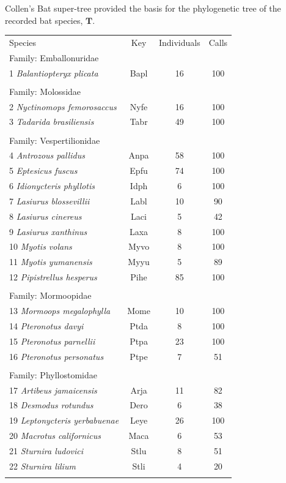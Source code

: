 \documentclass[wsdraft]{ws-rv9x6} %
\begin{document}
Collen's \cite{collen2012evolution} Bat super-tree provided the basis for the phylogenetic tree of the recorded bat species, \(\mathbf{T}\). 

\begin{table}[ht]
	{\begin{tabular}{@{}lccc@{}} \toprule
			Species & Key & Individuals & Calls \\ \colrule
			Family: Emballonuridae &&& \\
			1 \textit{Balantiopteryx plicata} & Bapl & 16 & 100 \\
			\\
			Family: Molossidae &&& \\
			2 \textit{Nyctinomops femorosaccus} & Nyfe & 16 & 100 \\
			3 \textit{Tadarida brasiliensis} & Tabr & 49 & 100  \\
			\\
			Family: Vespertilionidae &&& \\
			4 \textit{Antrozous pallidus} & Anpa & 58 & 100 \\
			5 \textit{Eptesicus fuscus} & Epfu & 74 & 100 \\
			6 \textit{Idionycteris phyllotis} & Idph & 6 & 100 \\
			7 \textit{Lasiurus blossevillii} & Labl & 10 & 90 \\
			8 \textit{Lasiurus cinereus} & Laci & 5 & 42 \\
			9 \textit{Lasiurus xanthinus} & Laxa & 8 & 100 \\
			10 \textit{Myotis volans} & Myvo & 8 & 100 \\
			11 \textit{Myotis yumanensis} & Myyu & 5 & 89 \\
			12 \textit{Pipistrellus hesperus} & Pihe & 85 & 100 \\
			\\
			Family: Mormoopidae &&& \\
			13 \textit{Mormoops megalophylla} & Mome & 10 & 100 \\
			14 \textit{Pteronotus davyi} & Ptda & 8 & 100 \\
			15 \textit{Pteronotus parnellii} & Ptpa & 23 & 100 \\
			16 \textit{Pteronotus personatus} & Ptpe & 7 & 51 \\
			\\
			Family: Phyllostomidae &&& \\
			17 \textit{Artibeus jamaicensis} & Arja & 11 & 82 \\
			18 \textit{Desmodus rotundus} & Dero & 6 & 38 \\
			19 \textit{Leptonycteris yerbabuenae} & Leye & 26 & 100 \\
			20 \textit{Macrotus californicus} & Maca & 6 & 53 \\
			21 \textit{Sturnira ludovici} & Stlu & 8 & 51 \\
			22 \textit{Sturnira lilium} & Stli & 4 & 20 \\
			\botrule
		\end{tabular}
	}
	\label{tab::dataset}
\end{table}
\end{document}
